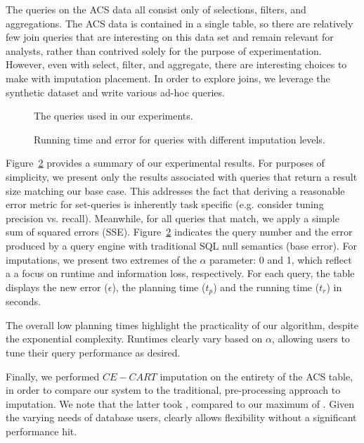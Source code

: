 The queries on the ACS data all consist only of selections, filters, and aggregations.
The ACS data is contained in a single table, so there are relatively few join queries that are interesting on this data set and remain relevant for analysts, rather
than contrived solely for the purpose of experimentation.
However, even with select, filter, and aggregate, there are interesting choices to make with imputation placement. In order to explore joins, we leverage the synthetic
dataset and write various ad-hoc queries.

\begin{figure}
  \centerfloat
  
  \caption{The queries used in our experiments.}
  \label{fig:queries}
\end{figure}

\begin{figure}
  \centerfloat
  
  \caption{Running time and error for queries with different imputation levels.}
  \label{fig:experiments}
\end{figure}

Figure~\ref{fig:experiments} provides a summary of our experimental results. For purposes of simplicity, we present only the results associated with
queries that return a result size matching our base case. This addresses the fact that deriving a reasonable error metric for set-queries 
is inherently task specific (e.g. consider tuning precision vs. recall). Meanwhile, for all queries that match, we apply a simple sum of squared errors
(SSE). Figure~\ref{fig:experiments} indicates the query number and the error produced by a query engine with traditional SQL null semantics (base error).
For imputations, we present two extremes of the $\alpha$ parameter: 0 and 1, which reflect a a focus on runtime and information loss, respectively.
For each query, the table displays the new error ($\epsilon$), the planning time ($t_p$) and the running time ($t_r$) in seconds.

The overall low planning times highlight the practicality of our algorithm, despite the exponential complexity. Runtimes clearly vary based on $\alpha$, allowing
users to tune their query performance as desired.


Finally, we performed $CE-CART$ imputation on the entirety of the ACS table, in order to compare our system to the traditional, pre-processing approach to imputation.
We note that the latter took , compared to our maximum of . Given the varying needs of database users, \ProjectName{} clearly allows flexibility without
a significant performance hit.



